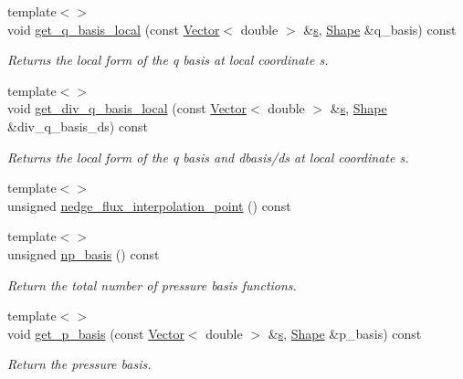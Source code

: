 \begin{DoxyCompactItemize}
{\footnotesize template$<$$>$ }\\void \hyperlink{classoomph_1_1TAxisymmetricPoroelasticityElement_a2f616b75cf70b2aead5326609ef03c92}{get\+\_\+q\+\_\+basis\+\_\+local} (const \hyperlink{classoomph_1_1Vector}{Vector}$<$ double $>$ \&\hyperlink{cfortran_8h_ab7123126e4885ef647dd9c6e3807a21c}{s}, \hyperlink{classoomph_1_1Shape}{Shape} \&q\+\_\+basis) const
\begin{DoxyCompactList}\small\item\em Returns the local form of the q basis at local coordinate s. \end{DoxyCompactList}\item 
{\footnotesize template$<$$>$ }\\void \hyperlink{classoomph_1_1TAxisymmetricPoroelasticityElement_af452f0a776720636babc94bf1205f5ca}{get\+\_\+div\+\_\+q\+\_\+basis\+\_\+local} (const \hyperlink{classoomph_1_1Vector}{Vector}$<$ double $>$ \&\hyperlink{cfortran_8h_ab7123126e4885ef647dd9c6e3807a21c}{s}, \hyperlink{classoomph_1_1Shape}{Shape} \&div\+\_\+q\+\_\+basis\+\_\+ds) const
\begin{DoxyCompactList}\small\item\em Returns the local form of the q basis and dbasis/ds at local coordinate s. \end{DoxyCompactList}\item 
{\footnotesize template$<$$>$ }\\unsigned \hyperlink{classoomph_1_1TAxisymmetricPoroelasticityElement_a4352c34520749f27a95a0b0161d3e4a7}{nedge\+\_\+flux\+\_\+interpolation\+\_\+point} () const
\item 
{\footnotesize template$<$$>$ }\\unsigned \hyperlink{classoomph_1_1TAxisymmetricPoroelasticityElement_a27b709b447e969125867e32c4fb5e10e}{np\+\_\+basis} () const
\begin{DoxyCompactList}\small\item\em Return the total number of pressure basis functions. \end{DoxyCompactList}\item 
{\footnotesize template$<$$>$ }\\void \hyperlink{classoomph_1_1TAxisymmetricPoroelasticityElement_abb0d8bbdf015bd4ef8b1d8637f93bc6d}{get\+\_\+p\+\_\+basis} (const \hyperlink{classoomph_1_1Vector}{Vector}$<$ double $>$ \&\hyperlink{cfortran_8h_ab7123126e4885ef647dd9c6e3807a21c}{s}, \hyperlink{classoomph_1_1Shape}{Shape} \&p\+\_\+basis) const
\begin{DoxyCompactList}\small\item\em Return the pressure basis. \end{DoxyCompactList}\end{DoxyCompactItemize}
